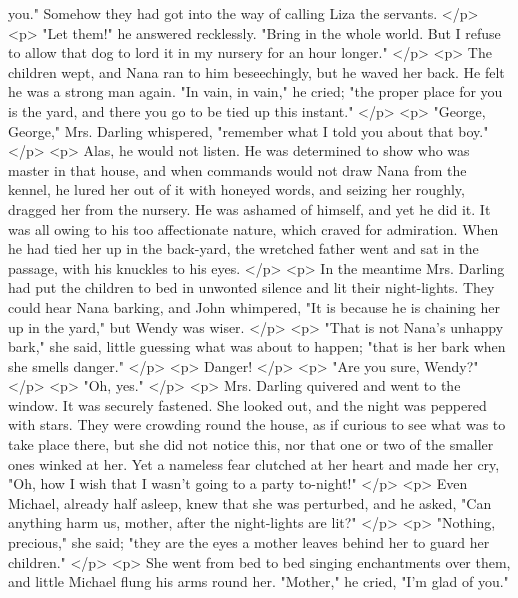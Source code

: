       you." Somehow they had got into the way of calling Liza the servants.
    </p>
    <p>
      "Let them!" he answered recklessly. "Bring in the whole world. But I
      refuse to allow that dog to lord it in my nursery for an hour longer."
    </p>
    <p>
      The children wept, and Nana ran to him beseechingly, but he waved her
      back. He felt he was a strong man again. "In vain, in vain," he cried;
      "the proper place for you is the yard, and there you go to be tied up this
      instant."
    </p>
    <p>
      "George, George," Mrs. Darling whispered, "remember what I told you about
      that boy."
    </p>
    <p>
      Alas, he would not listen. He was determined to show who was master in
      that house, and when commands would not draw Nana from the kennel, he
      lured her out of it with honeyed words, and seizing her roughly, dragged
      her from the nursery. He was ashamed of himself, and yet he did it. It was
      all owing to his too affectionate nature, which craved for admiration.
      When he had tied her up in the back-yard, the wretched father went and sat
      in the passage, with his knuckles to his eyes.
    </p>
    <p>
      In the meantime Mrs. Darling had put the children to bed in unwonted
      silence and lit their night-lights. They could hear Nana barking, and John
      whimpered, "It is because he is chaining her up in the yard," but Wendy
      was wiser.
    </p>
    <p>
      "That is not Nana's unhappy bark," she said, little guessing what was
      about to happen; "that is her bark when she smells danger."
    </p>
    <p>
      Danger!
    </p>
    <p>
      "Are you sure, Wendy?"
    </p>
    <p>
      "Oh, yes."
    </p>
    <p>
      Mrs. Darling quivered and went to the window. It was securely fastened.
      She looked out, and the night was peppered with stars. They were crowding
      round the house, as if curious to see what was to take place there, but
      she did not notice this, nor that one or two of the smaller ones winked at
      her. Yet a nameless fear clutched at her heart and made her cry, "Oh, how
      I wish that I wasn't going to a party to-night!"
    </p>
    <p>
      Even Michael, already half asleep, knew that she was perturbed, and he
      asked, "Can anything harm us, mother, after the night-lights are lit?"
    </p>
    <p>
      "Nothing, precious," she said; "they are the eyes a mother leaves behind
      her to guard her children."
    </p>
    <p>
      She went from bed to bed singing enchantments over them, and little
      Michael flung his arms round her. "Mother," he cried, "I'm glad of you."
